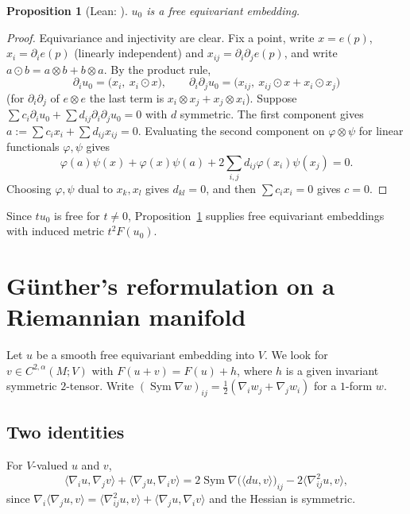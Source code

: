 \documentclass[11pt]{amsart}
\newtheorem{proposition}[theorem]{Proposition}
\theoremstyle{definition}
\newcommand{\Sym}{\operatorname{Sym}}
\newcommand{\inner}[2]{\langle #1, #2\rangle}
\newcommand{\lean}[1]{\texttt{\detokenize{#1}}}
\begin{document}
\begin{proposition}[Lean: \lean{veronese_map_free}]\label{prop:veronese}
$u_0$ is a free equivariant embedding.
\end{proposition}

\begin{proof}
Equivariance and injectivity are clear. Fix a point, write $x=e(p)$, $x_i=\partial_ie(p)$ (linearly
independent) and $x_{ij}=\partial_i\partial_je(p)$, and write $a\odot b=a\otimes b+b\otimes a$. By
the product rule,
\[
\partial_iu_0 = \bigl(x_i,\ x_i\odot x\bigr),\qquad
\partial_i\partial_ju_0 = \bigl(x_{ij},\ x_{ij}\odot x + x_i\odot x_j\bigr)
\]
(for $\partial_i\partial_j$ of $e\otimes e$ the last term is $x_i\otimes x_j+x_j\otimes x_i$).
Suppose $\sum c_i\partial_iu_0+\sum d_{ij}\partial_i\partial_ju_0=0$ with $d$ symmetric. The first
component gives $a:=\sum c_ix_i+\sum d_{ij}x_{ij}=0$. Evaluating the second component on
$\varphi\otimes\psi$ for linear functionals $\varphi,\psi$ gives
\[
\varphi(a)\psi(x)+\varphi(x)\psi(a)+2\sum_{i,j}d_{ij}\varphi(x_i)\psi(x_j)=0 .
\]
Choosing $\varphi,\psi$ dual to $x_k,x_l$ gives $d_{kl}=0$, and then $\sum c_ix_i=0$ gives
$c=0$.
\end{proof}

Since $tu_0$ is free for $t\ne0$, Proposition~\ref{prop:veronese} supplies free equivariant
embeddings with induced metric $t^2F(u_0)$.

\section{G\"unther's reformulation on a Riemannian manifold}\label{sec:gunther}

Let $u$ be a smooth free equivariant embedding into $V$. We look for $v\in C^{2,\alpha}(M;V)$ with
$F(u+v)=F(u)+h$, where $h$ is a given invariant symmetric $2$-tensor. Write
$(\Sym\nabla w)_{ij}=\tfrac12(\nabla_iw_j+\nabla_jw_i)$ for a $1$-form $w$.

\subsection{Two identities}
For $V$-valued $u$ and $v$,
\begin{equation}\label{eq:id1}
\inner{\nabla_iu}{\nabla_jv}+\inner{\nabla_ju}{\nabla_iv}
= 2\Sym\nabla\bigl(\inner{du}{v}\bigr)_{ij} - 2\inner{\nabla^2_{ij}u}{v},
\end{equation}
since $\nabla_i\inner{\nabla_ju}{v}=\inner{\nabla^2_{ij}u}{v}+\inner{\nabla_ju}{\nabla_iv}$ and the
Hessian is symmetric.
\end{document}
